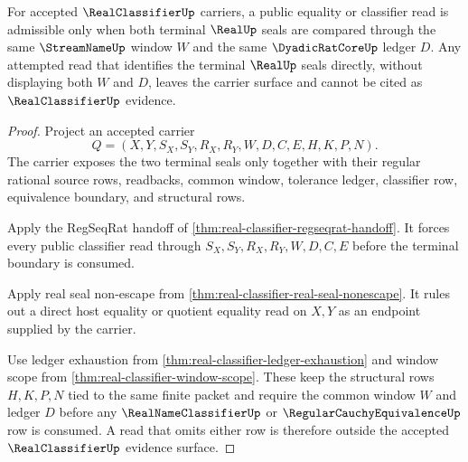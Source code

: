 \begin{theorem}
\label{thm:real-classifier-common-window-quotient-refusal}
For accepted $\RealClassifierUp$ carriers, a public equality or classifier read is admissible only when both terminal $\RealUp$ seals are compared through the same $\StreamNameUp$ window $W$ and the same $\DyadicRatCoreUp$ ledger $D$. Any attempted read that identifies the terminal $\RealUp$ seals directly, without displaying both $W$ and $D$, leaves the carrier surface and cannot be cited as $\RealClassifierUp$ evidence.
\end{theorem}
\begin{proof}
Project an accepted carrier
$$
Q=(X,Y,S_X,S_Y,R_X,R_Y,W,D,C,E,H,K,P,N).
$$
The carrier exposes the two terminal seals only together with their regular rational source rows, readbacks, common window, tolerance ledger, classifier row, equivalence boundary, and structural rows.

Apply the RegSeqRat handoff of \autoref{thm:real-classifier-regseqrat-handoff}. It forces every public classifier read through $S_X,S_Y,R_X,R_Y,W,D,C,E$ before the terminal boundary is consumed.

Apply real seal non-escape from \autoref{thm:real-classifier-real-seal-nonescape}. It rules out a direct host equality or quotient equality read on $X,Y$ as an endpoint supplied by the carrier.

Use ledger exhaustion from \autoref{thm:real-classifier-ledger-exhaustion} and window scope from \autoref{thm:real-classifier-window-scope}. These keep the structural rows $H,K,P,N$ tied to the same finite packet and require the common window $W$ and ledger $D$ before any $\RealNameClassifierUp$ or $\RegularCauchyEquivalenceUp$ row is consumed. A read that omits either row is therefore outside the accepted $\RealClassifierUp$ evidence surface.
\end{proof}

